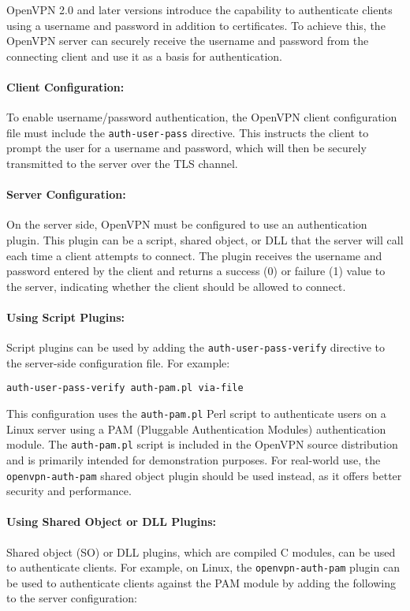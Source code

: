 OpenVPN 2.0 and later versions introduce the capability to authenticate clients using a username and password in addition to certificates. To achieve this, the OpenVPN server can securely receive the username and password from the connecting client and use it as a basis for authentication.

\paragraph{Client Configuration:}  
To enable username/password authentication, the OpenVPN client configuration file must include the \texttt{auth-user-pass} directive. This instructs the client to prompt the user for a username and password, which will then be securely transmitted to the server over the TLS channel.

\paragraph{Server Configuration:}  
On the server side, OpenVPN must be configured to use an authentication plugin. This plugin can be a script, shared object, or DLL that the server will call each time a client attempts to connect. The plugin receives the username and password entered by the client and returns a success (0) or failure (1) value to the server, indicating whether the client should be allowed to connect.

\paragraph{Using Script Plugins:}  
Script plugins can be used by adding the \texttt{auth-user-pass-verify} directive to the server-side configuration file. For example:

\begin{verbatim}
auth-user-pass-verify auth-pam.pl via-file
\end{verbatim}

This configuration uses the \texttt{auth-pam.pl} Perl script to authenticate users on a Linux server using a PAM (Pluggable Authentication Modules) authentication module. The \texttt{auth-pam.pl} script is included in the OpenVPN source distribution and is primarily intended for demonstration purposes. For real-world use, the \texttt{openvpn-auth-pam} shared object plugin should be used instead, as it offers better security and performance.

\paragraph{Using Shared Object or DLL Plugins:}  
Shared object (SO) or DLL plugins, which are compiled C modules, can be used to authenticate clients. For example, on Linux, the \texttt{openvpn-auth-pam} plugin can be used to authenticate clients against the PAM module by adding the following to the server configuration:

